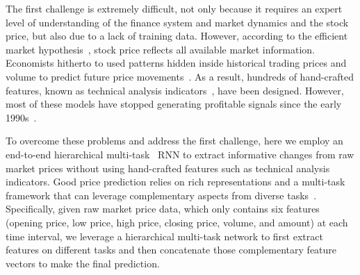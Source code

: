 The first challenge is extremely difficult, not only because it
requires an expert level of understanding of the finance system and
market dynamics and the stock price, but also
due to a lack of training data. However, according to the
efficient market
hypothesis~\cite{malkiel1970efficient}, stock price reflects all
available market information.
%
Economists hitherto to used patterns hidden inside historical
trading prices and volume to predict future price
movements~\cite{fama1966filter,jensen1967random}. As a result,
hundreds of hand-crafted features, known as technical analysis
indicators~\cite{kirkpatrick2010technical}, have been designed.
However, most of these models have stopped generating profitable
signals since the early 1990s~\cite{park2007we}.

To overcome these problems and address the first challenge, here
we employ an end-to-end hierarchical
multi-task~\cite{caruana1993multitask} RNN to extract informative
changes from raw market prices without using hand-crafted
features such as technical analysis indicators. Good price
prediction relies on rich representations and a multi-task
framework that can leverage complementary aspects from diverse
tasks~\cite{sogaard2016deep}. Specifically, given raw market
price data, which only contains six features (opening price, low
price, high price, closing price, volume, and amount) at each
time interval, we leverage a hierarchical multi-task network to
first extract features on different tasks and then concatenate
those complementary feature vectors to make the final prediction.

